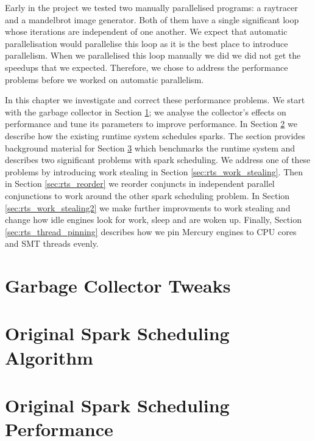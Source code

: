 

Early in the project
we tested two manually parallelised programs:
a raytracer and a mandelbrot image generator.
Both of them have a single significant loop
whose iterations are independent of one another.
We expect that automatic parallelisation would parallelise this loop
as it is the best place to introduce parallelism.
When we parallelised this loop manually we did
we did not get the speedups that we expected.
Therefore,
we chose to address the performance problems
before we worked on automatic parallelism.

In this chapter we investigate and correct these performance problems.
We start with the garbage collector in Section \ref{sec:gc};
we analyse the collector's effects on performance and tune its parameters
to improve performance.
In Section \ref{sec:original_scheduling} we describe how the existing runtime
system schedules sparks.
The section provides background material for Section
\ref{sec:original_scheduling_performance}
which benchmarks the runtime system and describes two significant problems with
spark scheduling.
We address one of these problems by introducing work stealing in Section
\ref{sec:rts_work_stealing}.
Then in Section \ref{sec:rts_reorder} we reorder conjuncts in independent
parallel conjunctions to work around the other spark scheduling problem.
In Section \ref{sec:rts_work_stealing2} we make further improvments to
work stealing and change how idle engines look for work, sleep and are
woken up.
Finally, Section \ref{sec:rts_thread_pinning} describes how we pin Mercury
engines to CPU cores and SMT threads evenly.

\section{Garbage Collector Tweaks}
\label{sec:gc}



\section{Original Spark Scheduling Algorithm}
\label{sec:original_scheduling}



\section{Original Spark Scheduling Performance}
\label{sec:original_scheduling_performance}

